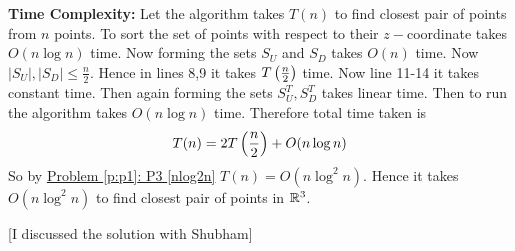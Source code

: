 \documentclass[a4paper, 11pt]{article}
\makeatletter
\newenvironment{listalgorithm}
{\par\noindent\hspace*{-\@totalleftmargin}%
	\minipage{\textwidth}\algorithm[H]}
{\endalgorithm\endminipage}
\makeatother
\begin{document}
{\begin{enumerate}[label=(\alph*)]
	\begin{listalgorithm}
		\DontPrintSemicolon
		\caption{}
	\end{listalgorithm}

\parinf
\textbf{Time Complexity:} Let the algorithm takes $T(n)$ to find closest pair of points from $n$ points. To sort the set of points with respect to their $z-$coordinate takes $O(n\log n)$ time. Now forming the sets $S_U$ and $S_D$ takes $O(n)$ time. Now $|S_U|,|S_D|\leq \frac{n}{2}$. Hence in lines 8,9 it takes $T\left(\frac{n}{2}\right)$ time. Now line 11-14 it takes constant time. Then again forming the sets $S_U^T,S_D^T$ takes linear time. Then to run the algorithm  takes $O(n\log n)$ time. Therefore total time taken is $$T(n)=2T\left(\frac{n}2\right)+O(n\log n)$$So by \hyperref[p:p1]{Problem \ref{p:p1}: P3 \ref{nlog2n}}  $T(n)=O(n\log^2n)$. Hence it takes $O(n\log^2n)$ to find closest pair of points in $\mathbb{R}^3$.
\end{enumerate}}\parinf

[I discussed the solution with Shubham]


\end{document}
